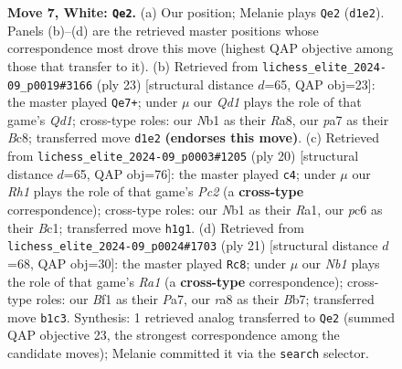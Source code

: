 \documentclass[11pt]{article}
\begin{document}
\begin{figure}[p]
\caption{\textbf{Move 7, White: \texttt{Qe2}.} (a) Our position; Melanie plays \texttt{Qe2} (\texttt{d1e2}). Panels (b)--(d) are the retrieved master positions whose correspondence most drove this move (highest QAP objective among those that transfer to it). (b) Retrieved from \texttt{lichess\_elite\_2024-09\_p0019\#3166} (ply 23) [structural distance $d$=65, QAP obj=23]: the master played \texttt{Qe7+}; under $\mu$ our \emph{Qd1} plays the role of that game's \emph{Qd1}; cross-type roles: our \emph{N}b1 as their \emph{R}a8, our \emph{p}a7 as their \emph{B}c8; transferred move \texttt{d1e2} \textbf{(endorses this move)}. (c) Retrieved from \texttt{lichess\_elite\_2024-09\_p0003\#1205} (ply 20) [structural distance $d$=65, QAP obj=76]: the master played \texttt{c4}; under $\mu$ our \emph{Rh1} plays the role of that game's \emph{Pc2} (a \textbf{cross-type} correspondence); cross-type roles: our \emph{N}b1 as their \emph{R}a1, our \emph{p}c6 as their \emph{B}c1; transferred move \texttt{h1g1}. (d) Retrieved from \texttt{lichess\_elite\_2024-09\_p0024\#1703} (ply 21) [structural distance $d$=68, QAP obj=30]: the master played \texttt{Rc8}; under $\mu$ our \emph{Nb1} plays the role of that game's \emph{Ra1} (a \textbf{cross-type} correspondence); cross-type roles: our \emph{B}f1 as their \emph{P}a7, our \emph{r}a8 as their \emph{B}b7; transferred move \texttt{b1c3}. Synthesis: 1 retrieved analog transferred to \texttt{Qe2} (summed QAP objective 23, the strongest correspondence among the candidate moves); Melanie committed it via the \texttt{search} selector.}
\label{fig:thought-m12}
\end{figure}

\clearpage
\end{document}
